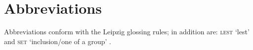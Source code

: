 \documentclass[output=paper,
modfonts
]{LSP/langsci}
\begin{document}
\section*{Abbreviations}
Abbreviations conform with the Leipzig glossing rules; in addition are: \textsc{lest} `lest' and \textsc{set}  `inclusion/one of a group' \citep{dixon1977a}.


{\sloppy
\printbibliography[heading=subbibliography,notkeyword=this]
}

\end{document}
